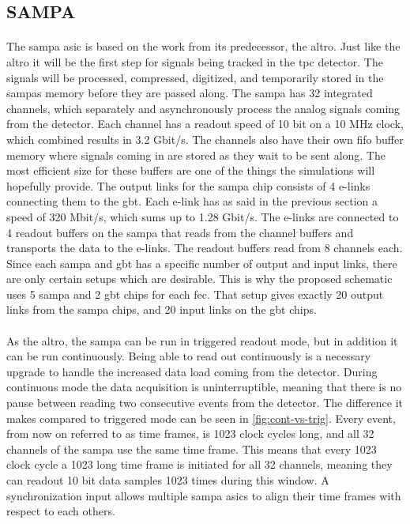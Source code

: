 \documentclass[a4paper, 12pt, openright, twoside]{report}
\begin{document}
\subsection{SAMPA}
\label{subsec:sampa}
\paragraph{}
The \gls{sampa} \gls{asic} is based on the work from its predecessor, the \gls{altro}.
Just like the \gls{altro} it will be the first step for signals being tracked in the \gls{tpc} detector.
The signals will be processed, compressed, digitized, and temporarily stored in the \glspl{sampa} memory before they are passed along.
The \gls{sampa} has 32 integrated channels, which separately and asynchronously process the analog signals coming from the detector\cite{tdr-016}.
Each channel has a readout speed of 10 bit on a 10 MHz clock, which combined results in 3.2 Gbit/s.
The channels also have their own \gls{fifo} buffer memory where signals coming in are stored as they wait to be sent along.
The most efficient size for these buffers are one of the things the simulations will hopefully provide.
The output links for the \gls{sampa} chip consists of 4 e-links connecting them to the \gls{gbt}.
Each e-link has as said in the previous section a speed of 320 Mbit/s, which sums up to 1.28 Gbit/s\cite{tdr-015}.
The e-links are connected to 4 readout buffers on the \gls{sampa} that reads from the channel buffers and transports the data to the e-links.
The readout buffers read from 8 channels each.
Since each \gls{sampa} and \gls{gbt} has a specific number of output and input links, there are only certain setups which are desirable.
This is why the proposed schematic uses 5 \gls{sampa} and 2 \gls{gbt} chips for each \gls{fec}.
That setup gives exactly 20 output links from the \gls{sampa} chips, and 20 input links on the \gls{gbt} chips.

\paragraph{}
As the \gls{altro}, the \gls{sampa} can be run in triggered readout mode, but in addition it can be run continuously.
Being able to read out continuously is a necessary upgrade to handle the increased data load coming from the detector.
During continuous mode the data acquisition is uninterruptible, meaning that there is no pause between reading two consecutive events from the detector.
The difference it makes compared to triggered mode can be seen in \ref{fig:cont-vs-trig}.
Every event, from now on referred to as time frames, is 1023 clock cycles long, and all 32 channels of the \gls{sampa} use the same time frame.
This means that every 1023 clock cycle a 1023 long time frame is initiated for all 32 channels, meaning they can readout 10 bit data samples 1023 times during this window.
A synchronization input allows multiple \gls{sampa} \gls{asic}s to align their time frames with respect to each others\cite{tdr-015}.
\end{document}
